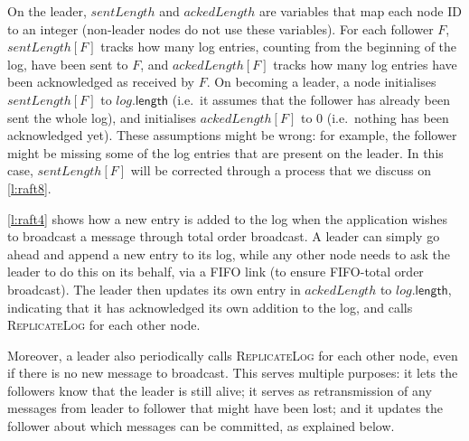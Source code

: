 On the leader, $\mathit{sentLength}$ and $\mathit{ackedLength}$ are variables that map each node ID to an integer (non-leader nodes do not use these variables).
For each follower $F$, $\mathit{sentLength}[F]$ tracks how many log entries, counting from the beginning of the log, have been sent to $F$, and $\mathit{ackedLength}[F]$ tracks how many log entries have been acknowledged as received by $F$.
On becoming a leader, a node initialises $\mathit{sentLength}[F]$ to $\mathit{log}.\mathsf{length}$ (i.e.\ it assumes that the follower has already been sent the whole log), and initialises $\mathit{ackedLength}[F]$ to $0$ (i.e.\ nothing has been acknowledged yet).
These assumptions might be wrong: for example, the follower might be missing some of the log entries that are present on the leader.
In this case, $\mathit{sentLength}[F]$ will be corrected through a process that we discuss on \autoref{l:raft8}.

\autoref{l:raft4} shows how a new entry is added to the log when the application wishes to broadcast a message through total order broadcast.
A leader can simply go ahead and append a new entry to its log, while any other node needs to ask the leader to do this on its behalf, via a FIFO link (to ensure FIFO-total order broadcast).
The leader then updates its own entry in $\mathit{ackedLength}$ to $\mathit{log}.\mathsf{length}$, indicating that it has acknowledged its own addition to the log, and calls \textsc{ReplicateLog} for each other node.

Moreover, a leader also periodically calls \textsc{ReplicateLog} for each other node, even if there is no new message to broadcast.
This serves multiple purposes: it lets the followers know that the leader is still alive; it serves as retransmission of any messages from leader to follower that might have been lost; and it updates the follower about which messages can be committed, as explained below.


